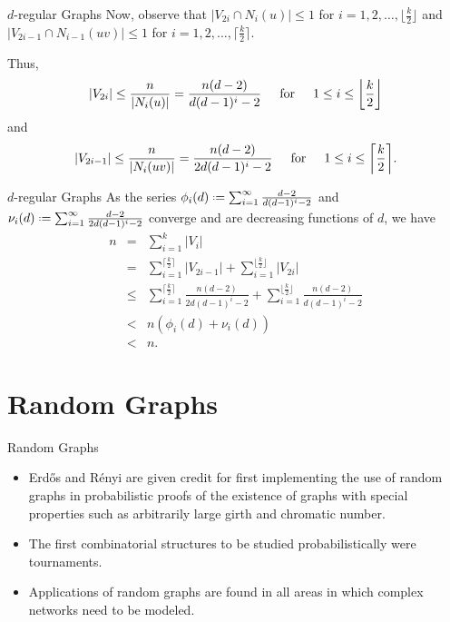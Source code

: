 \documentclass{beamer}
\newcommand*{\defeq}{\mathrel{\vcenter{\baselineskip0.5ex \lineskiplimit0pt
                     \hbox{\scriptsize.}\hbox{\scriptsize.}}}%
                     =}
\DeclarePairedDelimiter\ceil{\lceil}{\rceil}
\DeclarePairedDelimiter\floor{\lfloor}{\rfloor}
\begin{document}
\begin{frame}{$d$-regular Graphs}
Now, observe that $\vert V_{2i}\cap N_i(u)\vert\leq 1$ for $i=1,2,\dots,\lfloor\frac{k}{2}\rfloor$ and $\vert V_{2i-1}\cap N_{i-1}(uv)\vert\leq 1$ for $i=1,2,\dots,\lceil\frac{k}{2}\rceil$.  

Thus,
\begin{equation*}
\vert V_{2i}\vert\leq\frac{n}{\vert N_i(u)\vert}=\frac{n(d-2)}{d(d-1)^i-2}{\text{\hspace{.2in}for\hspace{.2in}}}1\leq i\leq\floor*{\frac{k}{2}}
\end{equation*}
and
\begin{equation*}
\vert V_{2i-1}\vert\leq\frac{n}{\vert N_i(uv)\vert}=\frac{n(d-2)}{2d(d-1)^i-2}{\text{\hspace{.2in}for\hspace{.2in}}}1\leq i\leq\ceil*{\frac{k}{2}}.
\end{equation*}
\end{frame}

\begin{frame}{$d$-regular Graphs}
As the series $\phi_i(d)\defeq\sum_{i=1}^{\infty}\frac{d-2}{d(d-1)^i-2}$ and $\nu_i(d)\defeq\sum_{i=1}^{\infty}\frac{d-2}{2d(d-1)^i-2}$ converge and are decreasing functions of $d$, we have
\begin{eqnarray*}
n&=&\sum_{i=1}^k\vert V_i\vert\\
&=&\sum_{i=1}^{\lceil\frac{k}{2}\rceil}\vert V_{2i-1}\vert+\sum_{i=1}^{\lfloor\frac{k}{2}\rfloor}\vert V_{2i}\vert\\
&\leq&\sum_{i=1}^{\lceil\frac{k}{2}\rceil}\frac{n(d-2)}{2d(d-1)^i-2}+\sum_{i=1}^{\lfloor\frac{k}{2}\rfloor}\frac{n(d-2)}{d(d-1)^i-2}\\
&<&n(\phi_i(d)+\nu_i(d))\\
&<&n.
\end{eqnarray*}
\end{frame}


\section{Random Graphs}

\begin{frame}{Random Graphs}
\begin{itemize}
\item Erd\H{o}s and R\'{e}nyi are given credit for first implementing the use of random graphs in probabilistic proofs of the existence of graphs with special properties such as arbitrarily large girth and chromatic number.
\item The first combinatorial structures to be studied probabilistically were tournaments.
\item Applications of random graphs are found in all areas in which complex networks need to be modeled.
\end{itemize}
\end{frame}
\end{document}
